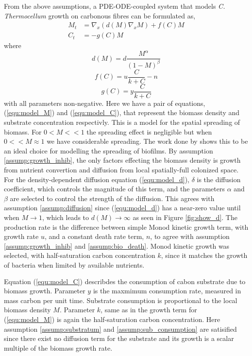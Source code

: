 From the above assumptions, a PDE-ODE-coupled system that models \textit{C. Thermocellum} growth on carbonous fibres can be formulated as,
\begin{align} 
   M_t &= \nabla_x \left( d(M) \nabla_x M \right) + f(C) M \label{equ:model_M}\\
   C_t &= -g(C) M \label{equ:model_C}
\end{align}
where
\begin{equation} \label{equ:model_d}
  d(M) = d \frac{M^\alpha}{(1-M)^\beta}
\end{equation}
\begin{equation} \label{equ:model_f}
  f(C) = u \frac{C}{k + C} - n 
\end{equation}
\begin{equation} \label{equ:model_g}
  g(C) = y \frac{C}{k + C}
\end{equation}
with all parameters non-negative.
Here we have a pair of equations, (\ref{equ:model_M}) and (\ref{equ:model_C}), that represent the biomass density and substrate concentration respectivly.
This is a model for the spatial spreading of biomass.
For $0 < M << 1$ the spreading effect is negligible but when $0 << M \approx 1$ we have considerable spreading.
The work done by \cite{khassehkhan2009nonlinearMaster} shows this to be an ideal choice for modelling the spreading of biofilms.
By assumption \ref{assump:growth_inhib}, the only factors effecting the biomass density is growth from nutrient convertion and diffusion from local spatially-full colonized space.
For the density-dependent diffusion equation (\ref{equ:model_d}), $\delta$ is the diffusion coefficient, which controls the magnitude of this term, and the parameters $\alpha$ and $\beta$ are selected to control the strength of the diffusion.
This agrees with assumption \ref{assump:diffusion} since (\ref{equ:model_d}) has a near-zero value until when $M \to 1$, which leads to $d(M) \to \infty$ as seen in Figure \ref{fig:show_d}. 
The production rate is the difference between simple Monod kinetic growth term, with growth rate $u$, and a constant death rate term, $n$, to agree with assumption \ref{assump:growth_inhib} and \ref{assump:bio_death}.
Monod kinetic growth was selected, with half-saturation carbon concentration $k$, since it matches the growth of bacteria when limited by available nutrients. %

Equation (\ref{equ:model_C}) describdes the consumption of cabon substrate due to biomass growth.
Parameter $y$ is the maxmimum consumption rate, measured in mass carbon per unit time.
Substrate consumption is proportional to the local biomass density $M$. 
Parameter $k$, same as in the growth term for (\ref{equ:model_M}) is again the half-saturation carbon concentration.
Here assumption \ref{assump:substratum} and \ref{assump:sub_consumption} are satisified since there exist no diffusion term for the substrate and its growth is a scalar multiple of the biomass growth rate.


